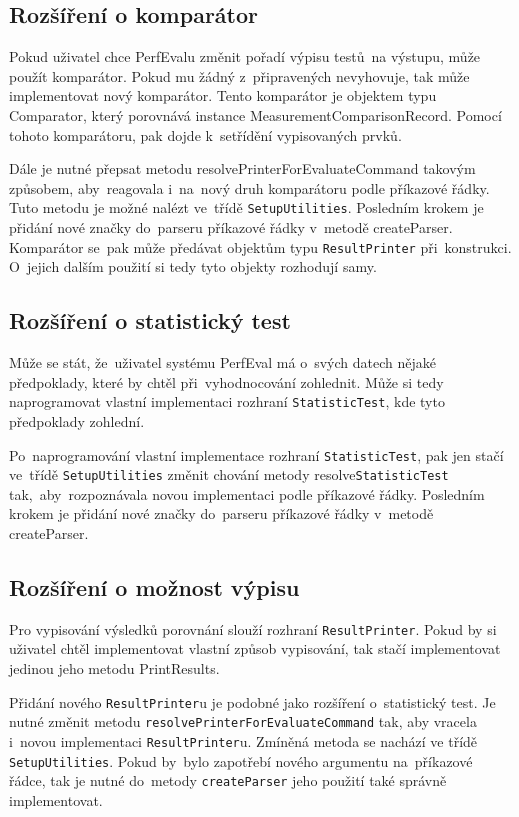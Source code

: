 \subsection{Rozšíření o komparátor}

Pokud uživatel chce  PerfEvalu změnit pořadí výpisu testů~na výstupu, může použít komparátor.
Pokud mu žádný z~připravených nevyhovuje, tak může implementovat nový komparátor.
Tento komparátor je objektem typu Comparator, který porovnává instance MeasurementComparisonRecord. Pomocí tohoto
komparátoru, pak dojde k~setřídění vypisovaných prvků.

Dále je nutné přepsat metodu resolvePrinterForEvaluateCommand takovým způsobem, aby~reagovala i~na~nový druh komparátoru
podle příkazové řádky. Tuto metodu je možné nalézt ve~třídě \lstinline{SetupUtilities}.
Posledním krokem je přidání nové značky do~parseru příkazové řádky v~metodě createParser.
Komparátor se~pak může předávat objektům typu \lstinline{ResultPrinter} při~konstrukci.
O~jejich dalším použití si tedy tyto objekty rozhodují samy.

\subsection{Rozšíření o statistický test}

Může se stát, že~uživatel systému PerfEval má o~svých datech nějaké předpoklady, které
by chtěl při~vyhodnocování zohlednit. Může si tedy naprogramovat vlastní implementaci
rozhraní \lstinline{StatisticTest}, kde tyto předpoklady zohlední.

Po~naprogramování vlastní implementace rozhraní \lstinline{StatisticTest}, pak jen stačí ve~třídě \lstinline{SetupUtilities}
změnit chování metody resolve\lstinline{StatisticTest} tak,~aby~rozpoznávala novou implementaci podle příkazové řádky. Posledním krokem je
přidání nové značky do~parseru příkazové řádky v~metodě createParser.

\subsection{Rozšíření o možnost výpisu}

Pro vypisování výsledků porovnání slouží rozhraní \lstinline{ResultPrinter}. Pokud by si uživatel chtěl implementovat
vlastní způsob vypisování, tak stačí implementovat jedinou jeho metodu PrintResults.

Přidání nového \lstinline{ResultPrinter}u je podobné jako rozšíření o~statistický test.
Je nutné změnit metodu \lstinline{resolvePrinterForEvaluateCommand} tak, aby vracela
i~novou implementaci \lstinline{ResultPrinter}u. Zmíněná metoda se nachází ve třídě
\lstinline{SetupUtilities}.
Pokud by~bylo zapotřebí nového argumentu na~příkazové řádce, tak je nutné do~metody \lstinline{createParser} jeho použití také
správně implementovat.

